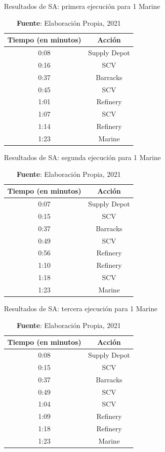 \begin{table}[H]
\centering
\def\arraystretch{1.2}
\captionsetup{justification=centering}
\caption{Resultados de SA: primera ejecución para 1 Marine}
\label{tab:marine1}
\begin{tabular}{|c|c|}
\hline
\textbf{Tiempo (en minutos)} & \textbf{Acción} \\
\hline
0:08	&  Supply Depot	 \\ 
0:16	&  SCV	  \\
0:37	&  Barracks	  \\
0:45	&  SCV	  \\
1:01	&  Refinery	  \\
1:07	&  SCV	  \\
1:14	&  Refinery	  \\
1:23	&  Marine \\ \hline
\end{tabular}
\caption*{\textbf{Fuente}: Elaboración Propia, 2021}
\end{table}

\begin{table}[H]
\centering
\def\arraystretch{1.2}
\captionsetup{justification=centering}
\caption{Resultados de SA: segunda ejecución para 1 Marine}
\label{tab:marine2}
\begin{tabular}{|c|c|}
\hline
\textbf{Tiempo (en minutos)} & \textbf{Acción} \\
\hline
0:07	&  Supply Depot	 \\ 
0:15	&  SCV	  \\
0:37	&  Barracks	  \\
0:49	&  SCV	  \\
0:56	&  Refinery	  \\
1:10	&  Refinery	  \\
1:18	&  SCV	  \\
1:23	&  Marine \\ \hline
\end{tabular}
\caption*{\textbf{Fuente}: Elaboración Propia, 2021}
\end{table}

\begin{table}[H]
\centering
\def\arraystretch{1.2}
\captionsetup{justification=centering}
\caption{Resultados de SA: tercera ejecución para 1 Marine}
\label{tab:marine3}
\begin{tabular}{|c|c|}
\hline
\textbf{Tiempo (en minutos)} & \textbf{Acción} \\
\hline
0:08	&  Supply Depot	 \\ 
0:15	&  SCV	  \\
0:37	&  Barracks	  \\
0:49	&  SCV	  \\
1:04	&  SCV  \\
1:09	&  Refinery	  \\
1:18	&  Refinery	  \\
1:23	&  Marine \\ \hline
\end{tabular}
\caption*{\textbf{Fuente}: Elaboración Propia, 2021}
\end{table}

